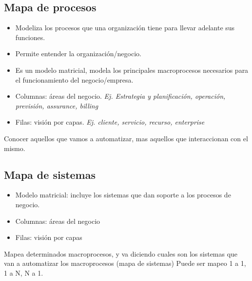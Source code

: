 \documentclass[titlepage,a4paper]{article}
\begin{document}
\subsection{Mapa de procesos}
    \begin{itemize}
        \item Modeliza los procesos que una organización tiene para llevar adelante sus funciones.
        \item Permite entender la organización/negocio.
        \item Es un modelo matricial, modela los principales macroprocesos necesarios para el funcionamiento del negocio/empresa.
        \item Columnas: áreas del negocio. \textit{Ej. Estrategia y planificación, operación, previsión, assurance, billing}
        \item Filas: visión por capas. \textit{Ej. cliente, servicio, recurso, enterprise}
    \end{itemize}
    
    
    Conocer aquellos que vamos a automatizar, mas aquellos que interaccionan con el mismo.
    
\subsection{Mapa de sistemas}
    \begin{itemize}
        \item Modelo matricial: incluye los sistemas que dan soporte a los procesos de negocio.
        \item Columnas: áreas del negocio
        \item Filas: visión por capas
    \end{itemize}

Mapea determinados macroprocesos, y va diciendo cuales son los sistemas que van a automatizar los macroprocesos (mapa de sistemas) Puede ser mapeo 1 a 1, 1 a N, N a 1.
\end{document}
